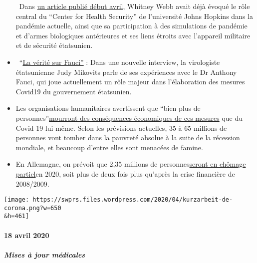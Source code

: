 \begin{itemize}
  ~Dans
  \href{https://www.thelastamericanvagabond.com/top-news/all-roads-lead-dark-winter/}{un
  article publié début avril,} Whitney Webb avait déjà évoqué le rôle
  central du ``Center for Health Security'' de l'université Johns
  Hopkins dans la pandémie actuelle, ainsi que sa participation à des
  simulations de pandémie et d'armes biologiques antérieures et ses
  liens étroits avec l'appareil militaire et de sécurité étatsunien.
\item
  ~``\href{https://childrenshealthdefense.org/news/the-truth-about-fauci-featuring-dr-judy-mikovits/}{La
  vérité sur Fauci''} : Dans une nouvelle interview, la virologiste
  étatsunienne Judy Mikovits parle de ses expériences avec le Dr Anthony
  Fauci, qui joue actuellement un rôle majeur dans l'élaboration des
  mesures Covid19 du gouvernement étatsunien.
\item
  Les organisations humanitaires avertissent que ``bien plus de
  personnes''\href{https://www.welt.de/wirtschaft/article207092745/Corona-Pandemie-Rezession-beschert-der-Welt-die-noch-groessere-Katastrophe.html}{mourront
  des conséquences économiques de ces mesures} que du Covid-19 lui-même.
  Selon les prévisions actuelles, 35 à 65 millions de personnes vont
  tomber dans la pauvreté absolue à la suite de la récession mondiale,
  et beaucoup d'entre elles sont menacées de famine.
\item
  En Allemagne, on prévoit que 2,35 millions de
  personnes\href{https://www.boeckler.de/pdf/p_wsi_pb_38_2020.pdf}{seront
  en chômage partiel}en 2020, soit plus de deux fois plus qu'après la
  crise financière de 2008/2009.
\end{itemize}

\texttt{[image: https://swprs.files.wordpress.com/2020/04/kurzarbeit-de-corona.png?w=650\\\&h=461]}

\hypertarget{18-avril-2020}{%
\paragraph{18 avril 2020}\label{18-avril-2020}}

\hypertarget{mises-uxe0-jour-muxe9dicales}{%
\subparagraph{\texorpdfstring{\textbf{Mises à jour
médicales}}{Mises à jour médicales}}\label{mises-uxe0-jour-muxe9dicales}}

